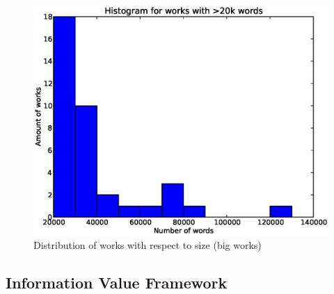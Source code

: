 \documentclass{pnastwo}
\begin{document}
\begin{article}
\begin{figure}
\centerline{\includegraphics[width=.4\textwidth]{figures/hist_tokens_big_works.eps}}
\caption{Distribution of works with respect to size (big works)}\label{afoto}
\end{figure}


\subsection{Information Value Framework}
\medskip
%


\end{article}
\end{document}
